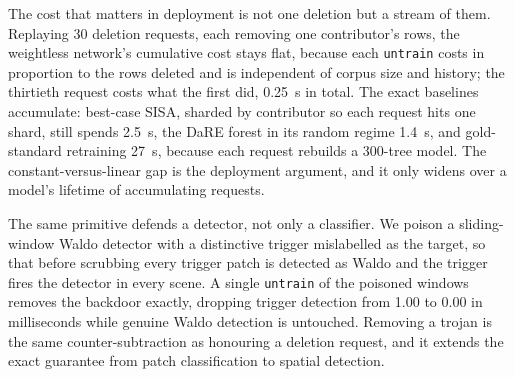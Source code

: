 The cost that matters in deployment is not one deletion but a stream of them. Replaying 30 deletion requests, each removing one contributor's rows, the weightless network's cumulative cost stays flat, because each \texttt{untrain} costs in proportion to the rows deleted and is independent of corpus size and history; the thirtieth request costs what the first did, 0.25~s in total. The exact baselines accumulate: best-case SISA, sharded by contributor so each request hits one shard, still spends 2.5~s, the DaRE forest in its random regime 1.4~s, and gold-standard retraining 27~s, because each request rebuilds a 300-tree model. The constant-versus-linear gap is the deployment argument, and it only widens over a model's lifetime of accumulating requests.

The same primitive defends a detector, not only a classifier. We poison a sliding-window Waldo detector with a distinctive trigger mislabelled as the target, so that before scrubbing every trigger patch is detected as Waldo and the trigger fires the detector in every scene. A single \texttt{untrain} of the poisoned windows removes the backdoor exactly, dropping trigger detection from 1.00 to 0.00 in milliseconds while genuine Waldo detection is untouched. Removing a trojan is the same counter-subtraction as honouring a deletion request, and it extends the exact guarantee from patch classification to spatial detection.
